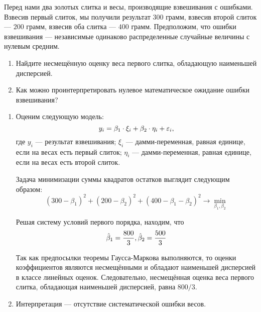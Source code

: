 \begin{problem}
Перед нами два золотых слитка и весы, производящие взвешивания с ошибками. Взвесив первый слиток, мы получили результат $300$ грамм, взвесив второй слиток — $200$ грамм, взвесив оба слитка — $400$ грамм. Предположим, что ошибки взвешивания — независимые одинаково распределенные случайные величины с нулевым средним.
\begin{enumerate}
\item Найдите несмещённую оценку веса первого слитка, обладающую наименьшей дисперсией.
\item Как можно проинтерпретировать нулевое математическое ожидание ошибки взвешивания?
\end{enumerate}


\begin{sol}
\begin{enumerate}
\item Оценим следующую модель:
\[y_i = \beta_1 \cdot \xi_i + \beta_2 \cdot \eta_i + \varepsilon_i, \]
где \(y_i\) — результат взвешивания; \(\xi_i\) — дамми-переменная, равная единице, если на весах есть первый слиток; \(\eta_i\) — дамми-переменная, равная единице, если на весах есть второй слиток.

Задача минимизации суммы квадратов остатков выглядит следующим образом:
\[(300 - \beta_1)^2 + (200 - \beta_2)^2 + (400 - \beta_1 - \beta_2)^2 \rightarrow \min_{\beta_1,\beta_2}    \]

Решая систему условий первого порядка, находим, что
\[\hat{\beta}_1 = \frac{800}{3}, \hat{\beta}_2 =\frac{500}{3}   \]

Так как предпосылки теоремы Гаусса-Маркова выполняются, то оценки коэффициентов являются несмещёнными и обладают наименьшей дисперсией в классе линейных оценок.
Следовательно, несмещённая оценка веса первого слитка, обладающая наименьшей дисперсией, равна \(800/3\).
\item Интерпретация — отсутствие систематической ошибки весов.
\end{enumerate}

\end{sol}
\end{problem}




